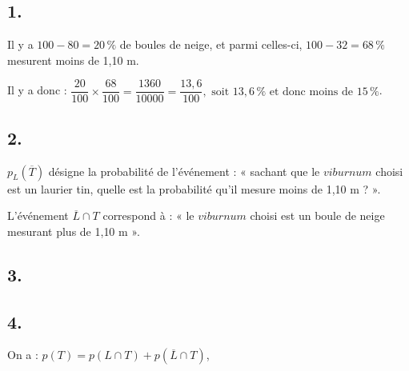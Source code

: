 \subsection*{1.}

Il y a \(100 - 80 = 20\,\%\) de boules de neige, et parmi celles-ci, \(100 - 32 = 68\,\%\) mesurent moins de 1{,}10 m.

Il y a donc : \(\dfrac{20}{100} \times \dfrac{68}{100} = \dfrac{1360}{10000} = \dfrac{13,6}{100}, \text{ soit }13{,}6\,\% \text{ et donc moins de } 15\,\%\).

\subsection*{2.}

\(p_L(\overline{T})\) désigne la probabilité de l'événement : « sachant que le \(\textit{viburnum}\) choisi est un laurier tin, quelle est la probabilité qu'il mesure moins de 1{,}10 m ? ».

L'événement \(\overline{L} \cap T\) correspond à : « le \(\textit{viburnum}\) choisi est un boule de neige mesurant plus de 1{,}10 m ».

\subsection*{3.}

\begin{center}
\end{center}

\subsection*{4.}

On a : \(p(T) = p(L \cap T) + p(\overline{L} \cap T)\),

